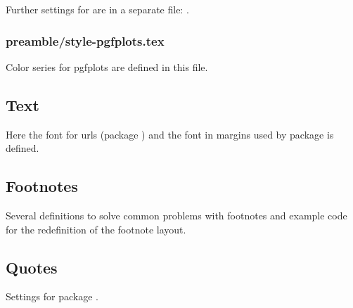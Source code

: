 Further settings for  are in a separate file: 
.


\subsubsection{preamble/style-pgfplots.tex}

Color series for pgfplots are defined in this file.


\subsection{Text}

Here the font for urls (package ) and the font in margins used by package  is defined.


\subsection{Footnotes}

Several definitions to solve common problems with footnotes and example code for the redefinition of the footnote layout.


\subsection{Quotes}

Settings for package .


